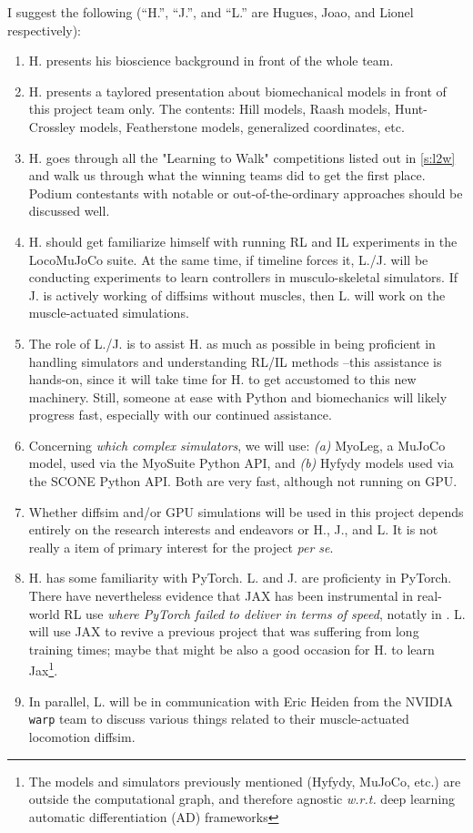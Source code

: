 \documentclass[12pt,a4paper]{article}
\begin{document}
I suggest the following (``H.'', ``J.'', and ``L.'' are Hugues, Joao, and Lionel respectively):
\begin{enumerate}
    \item H. presents his bioscience background in front of the whole team.
    \item H. presents a taylored presentation about biomechanical models in front of
        this project team only. The contents: Hill models, Raash models, Hunt-Crossley models,
        Featherstone models, generalized coordinates, etc.
    \item H. goes through all the "Learning to Walk" competitions listed out in \ref{s:l2w}
        and walk us through what the winning teams did to get the first place. Podium contestants
        with notable or out-of-the-ordinary approaches should be discussed well.
    \item H. should get familiarize himself with running RL and IL experiments in the 
        LocoMuJoCo \cite{Al-Hafez2023-dn} suite. At the same time, if timeline forces it, L./J.
        will be conducting experiments to learn controllers in musculo-skeletal simulators.
        If J. is actively working of diffsims without muscles, then L. will work on the
        muscle-actuated simulations.
    \item The role of L./J. is to assist H. as much as possible in being proficient in handling
        simulators and understanding RL/IL methods --this assistance is hands-on, since it will
        take time for H. to get accustomed to this new machinery. Still, someone at ease with
        Python and biomechanics will likely progress fast, especially with our continued
        assistance.
    \item Concerning \textit{which complex simulators}, we will use:
        \textit{(a)} MyoLeg, a MuJoCo model, used via the MyoSuite Python API, and
        \textit{(b)} Hyfydy models used via the SCONE Python API.
        Both are very fast, although not running on GPU. 
    \item Whether diffsim and/or GPU simulations will be used in this project depends entirely on
        the research interests and endeavors or H., J., and L. It is not really a item of primary
        interest for the project \textit{per se}.
    \item H. has some familiarity with PyTorch. L. and J. are proficienty in PyTorch.
        There have nevertheless evidence that JAX has been instrumental in real-world 
        RL use \emph{where PyTorch failed to deliver in terms of speed},
        notatly in \cite{Smith2022-sm}.
        L. will use JAX to revive a previous project that was suffering from long training times;
        maybe that might be also a good occasion for H. to learn Jax\footnote{%
        The models and simulators previously mentioned (Hyfydy, MuJoCo, etc.)
        are outside the computational graph, and therefore agnostic \textit{w.r.t.}
        deep learning automatic differentiation (AD) frameworks}.
    \item In parallel, L. will be in communication with Eric Heiden from the NVIDIA \texttt{warp}
        team to discuss various things related to their muscle-actuated locomotion diffsim.
\end{enumerate}
\end{document}
